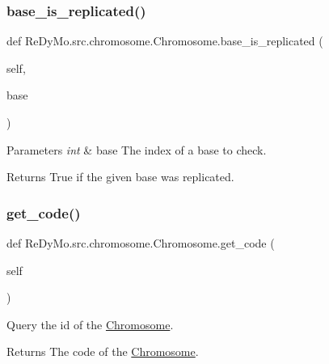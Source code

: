 \subsubsection{\texorpdfstring{base\+\_\+is\+\_\+replicated()}{base\_is\_replicated()}}
{\footnotesize\ttfamily def Re\+Dy\+Mo.\+src.\+chromosome.\+Chromosome.\+base\+\_\+is\+\_\+replicated (\begin{DoxyParamCaption}\item[{}]{self,  }\item[{}]{base }\end{DoxyParamCaption})}


\begin{DoxyParams}{Parameters}
{\em int} & base The index of a base to check. \\
\hline
\end{DoxyParams}
\begin{DoxyReturn}{Returns}
True if the given base was replicated. 
\end{DoxyReturn}
\mbox{\label{classReDyMo_1_1src_1_1chromosome_1_1Chromosome_a8fc8b953b0ba394a0dfc80fcdbcd274e}} 
\subsubsection{\texorpdfstring{get\+\_\+code()}{get\_code()}}
{\footnotesize\ttfamily def Re\+Dy\+Mo.\+src.\+chromosome.\+Chromosome.\+get\+\_\+code (\begin{DoxyParamCaption}\item[{}]{self }\end{DoxyParamCaption})}



Query the id of the \mbox{\hyperlink{classReDyMo_1_1src_1_1chromosome_1_1Chromosome}{Chromosome}}. 

\begin{DoxyReturn}{Returns}
The code of the \mbox{\hyperlink{classReDyMo_1_1src_1_1chromosome_1_1Chromosome}{Chromosome}}. 
\end{DoxyReturn}
\mbox{\label{classReDyMo_1_1src_1_1chromosome_1_1Chromosome_af22490836eb322b1dc55eaf10d14c7bb}} 
